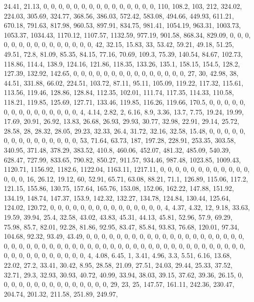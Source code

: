 \documentclass[
]{article}
\begin{document}
24.41, 21.13, 0, 0, 0, 0, 0, 0, 0, 0, 0, 0, 0, 0, 0, 0, 0, 110, 108.2,
103, 212, 324.02, 224.03, 305.69, 324.77, 368.56, 386.03, 572.42,
583.08, 494.66, 449.93, 611.21, 670.18, 791.63, 817.98, 960.53, 897.91,
834.75, 981.41, 1054.19, 963.31, 1003.73, 1053.37, 1034.43, 1170.12,
1107.57, 1132.59, 977.19, 901.58, 868.34, 829.09, 0, 0, 0, 0, 0, 0, 0,
0, 0, 0, 0, 0, 0, 0, 0, 42, 32.15, 15.83, 33, 53.42, 59.21, 49.18,
51.25, 49.51, 72.8, 81.09, 85.35, 84.15, 77.16, 70.69, 109.3, 75.39,
140.54, 84.67, 102.73, 118.86, 114.4, 138.9, 124.16, 121.86, 118.35,
133.26, 135.1, 158.15, 154.5, 128.2, 127.39, 132.92, 142.65, 0, 0, 0, 0,
0, 0, 0, 0, 0, 0, 0, 0, 0, 0, 0, 27, 30, 42.98, 38, 44.51, 331.88,
66.02, 224.51, 103.72, 87.11, 95.11, 105.09, 119.22, 117.32, 115.61,
113.56, 119.46, 128.86, 128.84, 112.35, 102.01, 111.74, 117.35, 114.33,
110.58, 118.21, 119.85, 125.69, 127.71, 133.46, 119.85, 116.26, 119.66,
170.5, 0, 0, 0, 0, 0, 0, 0, 0, 0, 0, 0, 0, 0, 0, 0, 4, 4.14, 2.82, 2,
6.16, 8.9, 3.36, 13.7, 7.75, 19.24, 19.99, 17.69, 20.91, 26.92, 13.83,
26.68, 26.93, 29.93, 30.77, 32.98, 22.91, 29.14, 25.72, 28.58, 28,
28.32, 28.05, 29.23, 32.33, 26.4, 31.72, 32.16, 32.58, 15.48, 0, 0, 0,
0, 0, 0, 0, 0, 0, 0, 0, 0, 0, 0, 0, 53, 71.64, 63.73, 187, 197.28,
228.91, 253.35, 303.58, 340.95, 371.48, 378.29, 383.52, 410.8, 460.06,
452.07, 481.32, 485.09, 540.39, 628.47, 727.99, 833.65, 790.82, 850.27,
911.57, 934.46, 987.48, 1023.85, 1009.43, 1120.71, 1156.92, 1182.6,
1122.04, 1163.11, 1217.11, 0, 0, 0, 0, 0, 0, 0, 0, 0, 0, 0, 0, 0, 0, 0,
16, 26.12, 19.12, 60, 52.91, 65.71, 63.08, 88.21, 71.1, 126.89, 115.06,
117.2, 121.15, 155.86, 130.75, 157.64, 165.76, 153.08, 152.06, 162.22,
147.88, 151.92, 134.19, 148.74, 147.37, 153.9, 142.32, 132.27, 134.78,
124.84, 130.44, 125.64, 124.02, 120.72, 0, 0, 0, 0, 0, 0, 0, 0, 0, 0, 0,
0, 0, 0, 0, 4, 4.37, 4.32, 12, 9.18, 33.63, 19.59, 39.94, 25.4, 32.58,
43.02, 43.83, 45.31, 44.13, 45.81, 52.96, 57.9, 69.29, 75.98, 85.7,
82.01, 92.28, 81.86, 92.95, 83.47, 85.84, 93.83, 76.68, 120.01, 97.34,
104.68, 92.32, 93.49, 43.49, 0, 0, 0, 0, 0, 0, 0, 0, 0, 0, 0, 0, 0, 0,
0, 0, 0, 0, 0, 0, 0, 0, 0, 0, 0, 0, 0, 0, 0, 0, 0, 0, 0, 0, 0, 0, 0, 0,
0, 0, 0, 0, 0, 0, 0, 0, 0, 0, 0, 0, 0, 0, 0, 0, 0, 0, 0, 0, 0, 0, 0, 0,
0, 0, 4, 4.08, 6.45, 1, 3.41, 4.96, 3.3, 5.51, 6.16, 13.68, 22.02, 27.2,
33.41, 30.42, 8.95, 28.58, 21.09, 27.51, 24.03, 29.44, 25.33, 37.52,
32.71, 29.3, 32.93, 30.93, 40.72, 40.99, 33.94, 38.03, 39.15, 37.62,
39.36, 26.15, 0, 0, 0, 0, 0, 0, 0, 0, 0, 0, 0, 0, 0, 0, 0, 29, 23, 25,
147.57, 161.11, 242.36, 230.47, 204.74, 201.32, 211.58, 251.89, 249.97,
\end{document}
